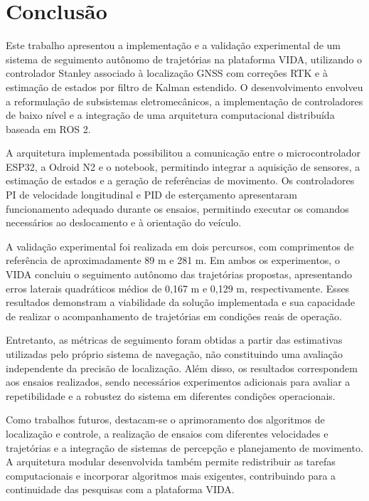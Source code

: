 \section{Conclusão}
\label{sec:conclusao}

Este trabalho apresentou a implementação e a validação experimental de um sistema de seguimento autônomo de trajetórias na plataforma VIDA, utilizando o controlador Stanley associado à localização GNSS com correções RTK e à estimação de estados por filtro de Kalman estendido. O desenvolvimento envolveu a reformulação de subsistemas eletromecânicos, a implementação de controladores de baixo nível e a integração de uma arquitetura computacional distribuída baseada em ROS 2.

A arquitetura implementada possibilitou a comunicação entre o microcontrolador ESP32, a Odroid N2 e o notebook, permitindo integrar a aquisição de sensores, a estimação de estados e a geração de referências de movimento. Os controladores PI de velocidade longitudinal e PID de esterçamento apresentaram funcionamento adequado durante os ensaios, permitindo executar os comandos necessários ao deslocamento e à orientação do veículo.

A validação experimental foi realizada em dois percursos, com comprimentos de referência de aproximadamente 89 m e 281 m. Em ambos os experimentos, o VIDA concluiu o seguimento autônomo das trajetórias propostas, apresentando erros laterais quadráticos médios de 0,167 m e 0,129 m, respectivamente. Esses resultados demonstram a viabilidade da solução implementada e sua capacidade de realizar o acompanhamento de trajetórias em condições reais de operação.

Entretanto, as métricas de seguimento foram obtidas a partir das estimativas utilizadas pelo próprio sistema de navegação, não constituindo uma avaliação independente da precisão de localização. Além disso, os resultados correspondem aos ensaios realizados, sendo necessários experimentos adicionais para avaliar a repetibilidade e a robustez do sistema em diferentes condições operacionais.

Como trabalhos futuros, destacam-se o aprimoramento dos algoritmos de localização e controle, a realização de ensaios com diferentes velocidades e trajetórias e a integração de sistemas de percepção e planejamento de movimento. A arquitetura modular desenvolvida também permite redistribuir as tarefas computacionais e incorporar algoritmos mais exigentes, contribuindo para a continuidade das pesquisas com a plataforma VIDA.